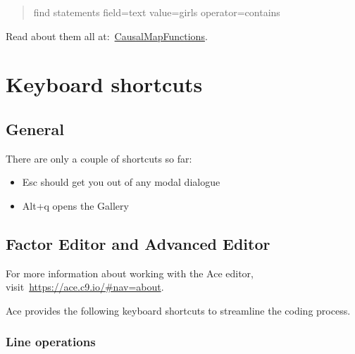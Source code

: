 \documentclass[
]{book}
\providecommand{\tightlist}{%
  \setlength{\itemsep}{0pt}\setlength{\parskip}{0pt}}
\begin{document}
\begin{quote}
find statements field=text value=girls operator=contains
\end{quote}

Read about them all at:~\href{https://stevepowell99.github.io/CausalMapFunctions/reference/index.html}{CausalMapFunctions}.

\hypertarget{xkeyboard}{%
\chapter{Keyboard shortcuts}\label{xkeyboard}}

\hypertarget{general}{%
\section{General}\label{general}}

There are only a couple of shortcuts so far:

\begin{itemize}
\tightlist
\item
  Esc should get you out of any modal dialogue
\item
  Alt+q opens the Gallery
\end{itemize}

\hypertarget{factor-editor-and-advanced-editor}{%
\section{Factor Editor and Advanced Editor}\label{factor-editor-and-advanced-editor}}

For more information about working with the Ace editor, visit~\url{https://ace.c9.io/\#nav=about}.

Ace provides the following keyboard shortcuts to streamline the coding process.

\hypertarget{line-operations}{%
\subsection{Line operations}\label{line-operations}}
\end{document}
